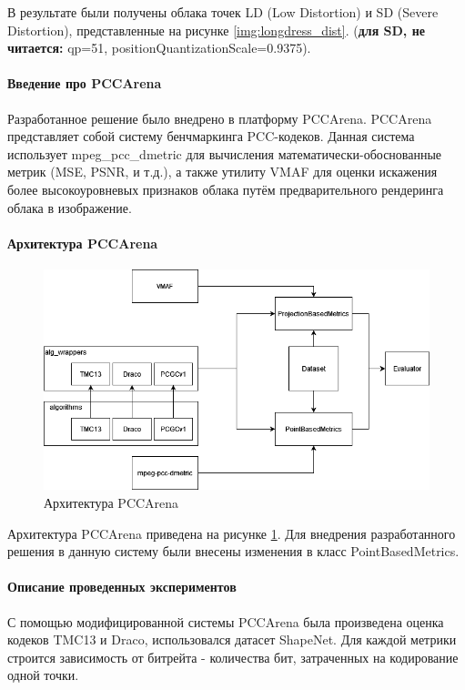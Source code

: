 \documentclass[a4paper,12pt]{extreport}
\begin{document}
В результате были получены облака точек LD (Low Distortion) и SD (Severe
Distortion), представленные на рисунке \ref{img:longdress_dist}. (\textbf{для
SD, не читается:} qp=51, positionQuantizationScale=0.9375).

\paragraph{Введение про PCCArena}

Разработанное решение было внедрено в платформу PCCArena. PCCArena представляет
собой систему бенчмаркинга PCC-кодеков. Данная система использует
mpeg\_pcc\_dmetric для вычисления математически-обоснованные метрик (MSE, PSNR,
и т.д.), а также утилиту VMAF для оценки искажения более высокоуровневых
признаков облака путём предварительного рендеринга облака в изображение.

\paragraph{Архитектура PCCArena}

\begin{figure}[H]
    \centering
    \includegraphics[width=0.7\linewidth]{assets/pcc_arena_architecture.png}
    \caption{Архитектура PCCArena}
    \label{img:pcc_arena_architecture}
\end{figure}

Архитектура PCCArena приведена на рисунке \ref{img:pcc_arena_architecture}. Для
внедрения разработанного решения в данную систему были внесены изменения в класс
PointBasedMetrics.

\paragraph{Описание проведенных экспериментов}

С помощью модифицированной системы PCCArena была произведена оценка кодеков
TMC13 и Draco, использовался датасет ShapeNet. Для каждой метрики строится
зависимость от битрейта - количества бит, затраченных на кодирование одной
точки.
\end{document}
